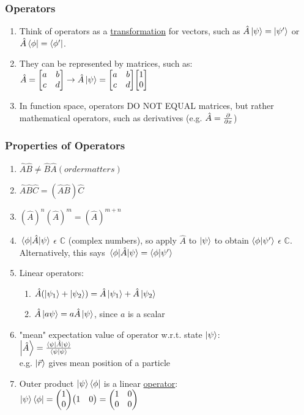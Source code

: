 \documentclass[]{article}
\begin{document}
\subsubsection{Operators}
\begin{enumerate}
    \item Think of operators as a \underline{transformation} for vectors, such as $\hat{A}\ket{\psi} = \ket{\psi'}$ or $\hat{A}\bra{\phi} = \bra{\phi'}$. 
    \item They can be represented by matrices, such as:\\
    $\hat{A} = \mqty[a & b \\ c & d] \rightarrow \hat{A}\ket{\psi} = \mqty[a & b \\ c & d] \mqty[1 \\ 0]$
    \item In function space, operators DO NOT EQUAL matrices, but rather mathematical operators, such as derivatives (e.g. $\hat{A} = \partialderivative{x}$)
\end{enumerate}

\subsubsection{Properties of Operators}
\begin{enumerate}
    \item $\hat{A}\hat{B} \ne \hat{B}\hat{A} (order matters)$
    \item $\hat{A}\hat{B}\hat{C} = (\hat{A}\hat{B})\hat{C}$
    \item $(\hat{A})^n (\hat{A})^m = (\hat{A})^{m+n}$
    \item $\mel{\phi}{\hat{A}}{\psi}$ $\epsilon$ $\mathbb{C}$ (complex numbers), so apply $\hat{A}$ to $\ket{\psi}$ to obtain $\braket{\phi}{\psi'}$ $\epsilon$ $\mathbb{C}$. Alternatively, this says $\mel{\phi}{\hat{A}}{\psi} = \braket{\phi}{\psi'}$
    \item Linear operators:
    \begin{enumerate}
        \item $\hat{A}(\ket{\psi_1}+\ket{\psi_2}) = \hat{A}\ket{\psi_1}+\hat{A}\ket{\psi_2}$
        \item $\hat{A}\ket{a\psi} = a\hat{A}\ket{\psi}$, since $a$ is a scalar
    \end{enumerate}
    \item "mean" expectation value of operator w.r.t. state $\ket{\psi}$:\\
    $\ket{\hat{A}} = \frac{\mel{\psi}{\hat{A}}{\psi}}{\braket{\psi}{\psi}}$\\
    e.g. $\ket{\vec{r}}$ gives mean position of a particle
    \item Outer product $\ket{\psi}\bra{\phi}$ is a linear \underline{operator}:\\
    $\ket{\psi}\bra{\phi} = \mqty(1 \\ 0)\mqty(1 & 0) = \mqty(1 & 0 \\ 0 & 0)$
\end{enumerate}
\end{document}

